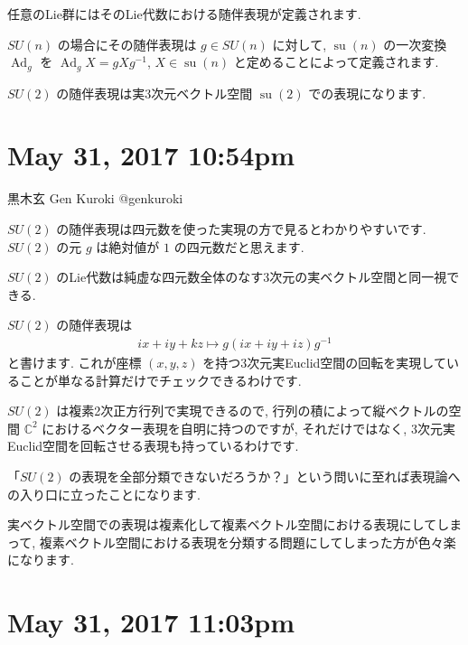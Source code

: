 \documentclass[12pt,twoside]{jarticle}
\theoremstyle{jplain}
\theoremstyle{jplain}
\theoremstyle{jplain}
\numberwithin{theorem}{section}
\numberwithin{equation}{section}
\numberwithin{figure}{section}
\numberwithin{table}{section}
\begin{document}
任意のLie群にはそのLie代数における随伴表現が定義されます. 

$SU(n)$ の場合にその随伴表現は $g\in SU(n)$ に対して, $\operatorname{su}(n)$ の一次変換 $\operatorname{Ad}_g$ を $\operatorname{Ad}_g X=gXg^{-1}$,  $X\in\operatorname{su}(n)$ と定めることによって定義されます. 

$SU(2)$ の随伴表現は実3次元ベクトル空間 $\operatorname{su}(2)$ での表現になります. 







\section{ May 31, 2017 10:54pm}








黒木玄 Gen Kuroki
@genkuroki


$SU(2)$ の随伴表現は四元数を使った実現の方で見るとわかりやすいです. $SU(2)$ の元 $g$ は絶対値が $1$ の四元数だと思えます. 

$SU(2)$ のLie代数は純虚な四元数全体のなす3次元の実ベクトル空間と同一視できる. 

$SU(2)$ の随伴表現は\begin{align*}ix+iy+kz\mapsto g(ix+iy+iz)g^{-1}\end{align*}と書けます. これが座標 $(x,y,z)$ を持つ3次元実Euclid空間の回転を実現していることが単なる計算だけでチェックできるわけです. 

$SU(2)$ は複素2次正方行列で実現できるので, 行列の積によって縦ベクトルの空間 $\mathbb C^2$ におけるベクター表現を自明に持つのですが, それだけではなく, 3次元実Euclid空間を回転させる表現も持っているわけです. 

「$SU(2)$ の表現を全部分類できないだろうか？」という問いに至れば表現論への入り口に立ったことになります. 

実ベクトル空間での表現は複素化して複素ベクトル空間における表現にしてしまって, 複素ベクトル空間における表現を分類する問題にしてしまった方が色々楽になります. 







\section{ May 31, 2017 11:03pm}
\end{document}
